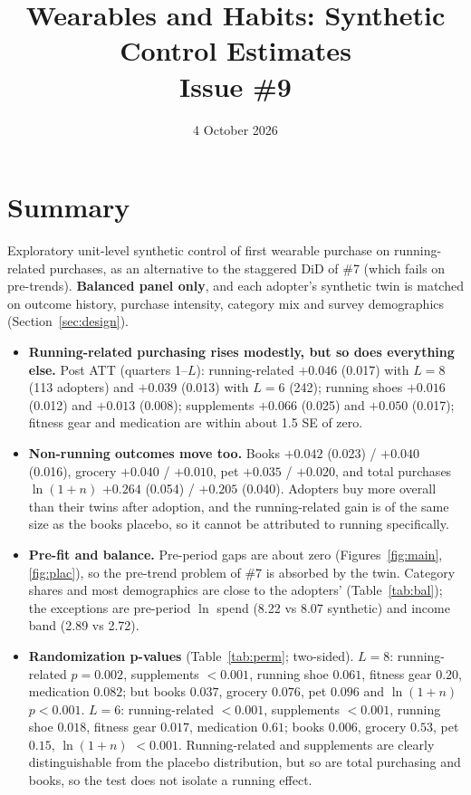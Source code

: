 \documentclass[11pt]{article}
\title{Wearables and Habits: Synthetic Control Estimates\\\large Issue \#9}
\date{4 October 2026}
\author{}
\begin{document}
\maketitle

\section{Summary}
Exploratory unit-level synthetic control of first wearable purchase on running-related purchases, as an alternative to the staggered DiD of \#7 (which fails on pre-trends). \textbf{Balanced panel only}, and each adopter's synthetic twin is matched on outcome history, purchase intensity, category mix and survey demographics (Section~\ref{sec:design}).
\begin{itemize}[nosep]
\item \textbf{Running-related purchasing rises modestly, but so does everything else.} Post ATT (quarters 1--$L$): running-related $+0.046$ (0.017) with $L=8$ (113 adopters) and $+0.039$ (0.013) with $L=6$ (242); running shoes $+0.016$ (0.012) and $+0.013$ (0.008); supplements $+0.066$ (0.025) and $+0.050$ (0.017); fitness gear and medication are within about 1.5 SE of zero.
\item \textbf{Non-running outcomes move too.} Books $+0.042$ (0.023) / $+0.040$ (0.016), grocery $+0.040$ / $+0.010$, pet $+0.035$ / $+0.020$, and total purchases $\ln(1+n)$ $+0.264$ (0.054) / $+0.205$ (0.040). Adopters buy more overall than their twins after adoption, and the running-related gain is of the same size as the books placebo, so it cannot be attributed to running specifically.
\item \textbf{Pre-fit and balance.} Pre-period gaps are about zero (Figures~\ref{fig:main}, \ref{fig:plac}), so the pre-trend problem of \#7 is absorbed by the twin. Category shares and most demographics are close to the adopters' (Table~\ref{tab:bal}); the exceptions are pre-period $\ln$ spend (8.22 vs 8.07 synthetic) and income band (2.89 vs 2.72).
\item \textbf{Randomization p-values} (Table~\ref{tab:perm}; two-sided). $L=8$: running-related $p=0.002$, supplements $<0.001$, running shoe $0.061$, fitness gear $0.20$, medication $0.082$; but books $0.037$, grocery $0.076$, pet $0.096$ and $\ln(1+n)$ $p<0.001$. $L=6$: running-related $<0.001$, supplements $<0.001$, running shoe $0.018$, fitness gear $0.017$, medication $0.61$; books $0.006$, grocery $0.53$, pet $0.15$, $\ln(1+n)$ $<0.001$. Running-related and supplements are clearly distinguishable from the placebo distribution, but so are total purchasing and books, so the test does not isolate a running effect.

\end{itemize}
\end{document}
